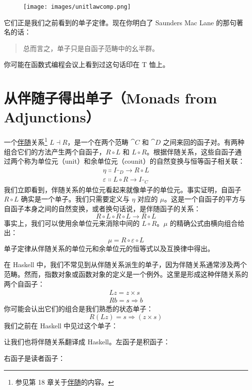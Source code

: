 \begin{figure}[H]
  \centering
  \texttt{[image: images/unitlawcomp.png]}
\end{figure}

\noindent
它们正是我们之前看到的单子定律。现在你明白了 Saunders Mac Lane 的那句著名的话：

\begin{quote}
  总而言之，单子只是自函子范畴中的幺半群。
\end{quote}
你可能在函数式编程会议上看到过这句话印在 T 恤上。

\section{从伴随子得出单子（Monads from Adjunctions）}

一个\hyperref[adjunctions]{伴随}关系\footnote{参见第 18 章关于\hyperref[adjunctions]{伴随}的内容。}
$L \dashv R$，是一个在两个范畴 $\cat{C}$ 和 $\cat{D}$ 之间来回的函子对。有两种组合它们的方法产生两个自函子，$R \circ L$ 和 $L \circ R$。根据伴随关系，这些自函子通过两个称为单位元（unit）和余单位元（counit）的自然变换与恒等函子相关联：
\begin{gather*}
  \eta \Colon I_{\cat{D}} \to R \circ L \\
  \varepsilon \Colon L \circ R \to I_{\cat{C}}
\end{gather*}
我们立即看到，伴随关系的单位元看起来就像单子的单位元。事实证明，自函子 $R \circ L$ 确实是一个单子。我们只需要定义与 $\eta$ 对应的 $\mu$。这是一个自函子的平方与自函子本身之间的自然变换，或者换句话说，是伴随函子的关系：
\[R \circ L \circ R \circ L \to R \circ L\]
事实上，我们可以使用余单位元来消除中间的 $L \circ R$。$\mu$ 的精确公式由横向组合给出：
\[\mu = R \circ \varepsilon \circ L\]
单子定律从伴随关系的单位元和余单位元的恒等式以及互换律中得出。

在 Haskell 中，我们不常见到从伴随关系派生的单子，因为伴随关系通常涉及两个范畴。然而，指数对象或函数对象的定义是一个例外。这里是形成这种伴随关系的两个自函子：
\begin{gather*}
  L z = z\times{}s \\
  R b = s \Rightarrow b
\end{gather*}
你可能会认出它们的组合是我们熟悉的状态单子：
\[R (L z) = s \Rightarrow (z\times{}s)\]
我们之前在 Haskell 中见过这个单子：

让我们也将伴随关系翻译成 Haskell。左函子是积函子：

右函子是读者函子：

